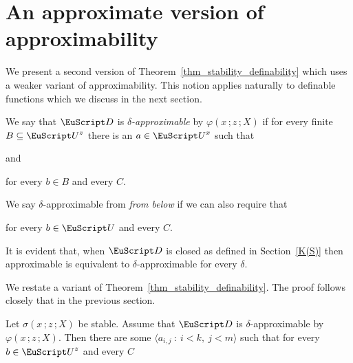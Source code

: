 \section{An approximate version of approximability}

We present a second version of Theorem~\ref{thm_stability_definability} which uses a weaker variant of approximability.
This notion applies naturally to definable functions which we discuss in the next section.

\begin{definition}\label{def_approx_X}\strut
  We say that ${\EuScript D}$ is \emph{$\delta$-approximable\/} by $\varphi(x\,;z\,;X)$ if for every finite $B\subseteq{\EuScript U}^z$ there is an $a\in{\EuScript U}^x$ such that\smallskip

  \quad and\smallskip

  \hfill for every $b\in B$ and every $C$.\smallskip

   We say  $\delta$-approximable from \emph{from below\/} if we can also require that\smallskip

  \hfill for every $b\in{\EuScript U}$ and every $C$.

\end{definition}
It is evident that, when ${\EuScript D}$ is closed as defined in Section~\ref{K(S)} then approximable is equivalent to $\delta$-approximable for every $\delta$.

 We restate a variant of Theorem~\ref{thm_stability_definability}.
 The proof follows closely that in the previous section.

\begin{theorem}\label{thm_epsilon_delta_stability_definability}
  Let $\sigma(x\,;z\,;X)$ be stable.
  Assume that ${\EuScript D}$ is $\delta$-approximable by $\varphi(x\,;z\,;X)$.
  Then there are some $\langle a_{i,j}\ :\ i< k,\ j<m\rangle$ such that for every $b\in{\EuScript U}^z$ and every $C$\medskip

  \medskip

\end{theorem}

